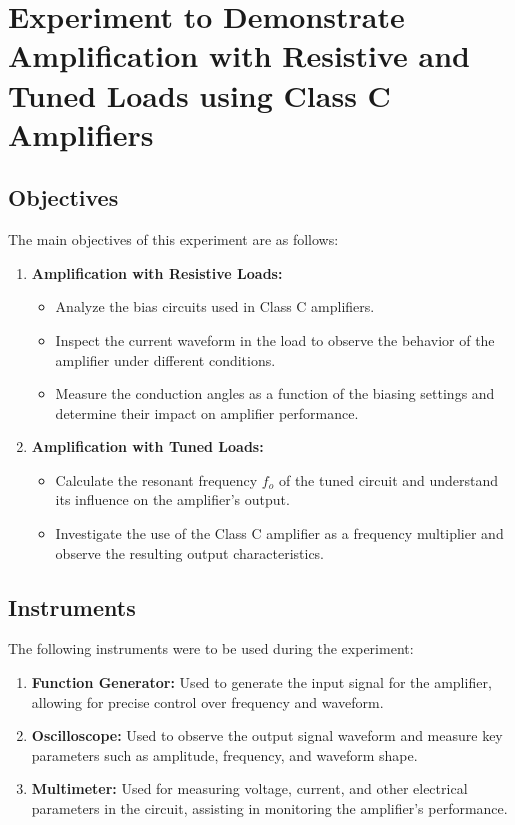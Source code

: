 \documentclass[12pt,a4paper]{article}
\begin{document}
    \newpage





    \section{Experiment to Demonstrate Amplification with Resistive and Tuned Loads using Class C Amplifiers}

    \subsection{Objectives}
    The main objectives of this experiment are as follows:

    \begin{enumerate}
        \item \textbf{Amplification with Resistive Loads:}
        \begin{itemize}
            \item Analyze the bias circuits used in Class C amplifiers.
            \item Inspect the current waveform in the load to observe the behavior of the amplifier under different conditions.
            \item Measure the conduction angles as a function of the biasing settings and determine their impact on amplifier performance.
        \end{itemize}
        \item \textbf{Amplification with Tuned Loads:}
        \begin{itemize}
            \item Calculate the resonant frequency \( f_o \) of the tuned circuit and understand its influence on the amplifier's output.
            \item Investigate the use of the Class C amplifier as a frequency multiplier and observe the resulting output characteristics.
        \end{itemize}
    \end{enumerate}

    \subsection{Instruments}
    The following instruments were to be used during the experiment:

    \begin{enumerate}
        \item \textbf{Function Generator:} Used to generate the input signal for the amplifier, allowing for precise control over frequency and waveform.
        \item \textbf{Oscilloscope:} Used to observe the output signal waveform and measure key parameters such as amplitude, frequency, and waveform shape.
        \item \textbf{Multimeter:} Used for measuring voltage, current, and other electrical parameters in the circuit, assisting in monitoring the amplifier’s performance.
    \end{enumerate}
\end{document}
